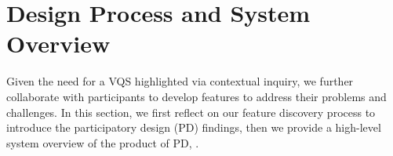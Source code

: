  \section{Design Process and System Overview\label{sec:pd_findings}}
 Given the need for a VQS highlighted via contextual inquiry, we further collaborate with participants to develop features to address their problems and challenges. In this section, we first reflect on our feature discovery process to introduce the participatory design (PD) findings, then we provide a high-level system overview of the product of PD, \zvpp.
